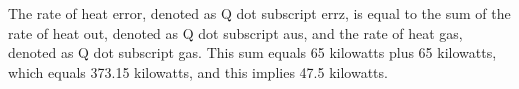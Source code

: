 The rate of heat error, denoted as Q dot subscript errz, is equal to the sum of the rate of heat out, denoted as Q dot subscript aus, and the rate of heat gas, denoted as Q dot subscript gas. This sum equals 65 kilowatts plus 65 kilowatts, which equals 373.15 kilowatts, and this implies 47.5 kilowatts.